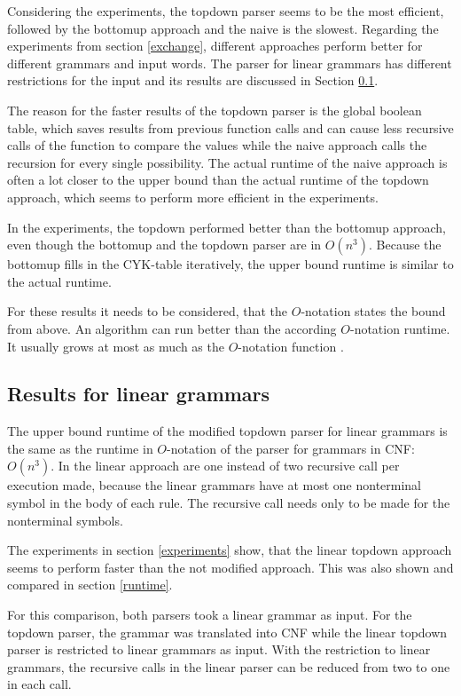\documentclass[a4paper, 11pt]{article}
\begin{document}
Considering the experiments, the topdown parser seems to be the most efficient, followed by the bottomup approach and the naive is the slowest. Regarding the experiments from section \ref{exchange}, different approaches perform better for different grammars and input words. 
The parser for linear grammars has different restrictions for the input and its results are discussed in Section \ref{results_linear}. 

The reason for the faster results of the topdown parser is the global boolean table, which saves results from previous function calls and can cause less recursive calls of the function to compare the values while the naive approach calls the recursion for every single possibility. The actual runtime of the naive approach is often a lot closer to the upper bound than the actual runtime of the topdown approach, which seems to perform more efficient in the experiments.

In the experiments, the topdown performed better than the bottomup approach, even though the bottomup and the topdown parser are in $O(n^3)$. Because the bottomup fills in the CYK-table iteratively, the upper bound runtime is similar to the actual runtime.

For these results it needs to be considered, that the $O$-notation states the bound from above. An algorithm can run better than the according $O$-notation runtime. It usually grows at most as much as the $O$-notation function \cite{bigO}. 

\subsection{Results for linear grammars}
\label{results_linear}

The upper bound runtime of the modified topdown parser for linear grammars is the same as the runtime in $O$-notation of the parser for grammars in CNF: $O(n^3)$. In the linear approach are one instead of two recursive call per execution made, because the linear grammars have at most one nonterminal symbol in the body of each rule. The recursive call needs only to be made for the nonterminal symbols. 

The experiments in section \ref{experiments} show, that the linear topdown approach seems to perform faster than the not modified approach. This was also shown and compared in section \ref{runtime}.

For this comparison, both parsers took a linear grammar as input. For the topdown parser, the grammar was translated into CNF while the linear topdown parser is restricted to linear grammars as input. With the restriction to linear grammars, the recursive calls in the linear parser can be reduced from two to one in each call.
\end{document}

